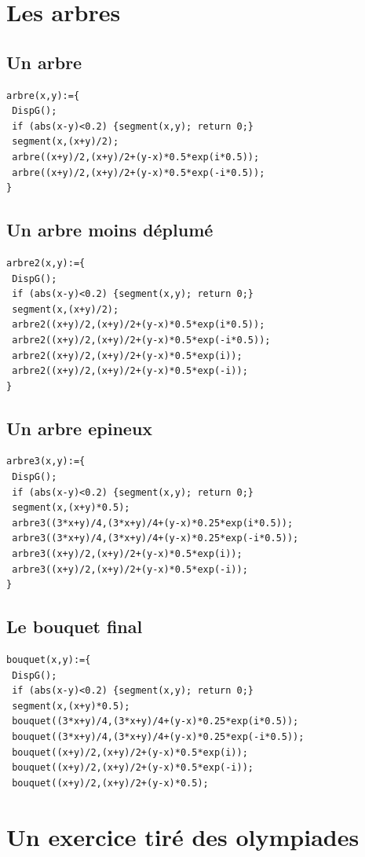 \documentclass[a4paper,11pt]{book}
\begin{document}
\section{Les arbres}
\subsection{Un arbre}
\begin{verbatim}
arbre(x,y):={
 DispG();
 if (abs(x-y)<0.2) {segment(x,y); return 0;}
 segment(x,(x+y)/2);
 arbre((x+y)/2,(x+y)/2+(y-x)*0.5*exp(i*0.5));
 arbre((x+y)/2,(x+y)/2+(y-x)*0.5*exp(-i*0.5));
}
\end{verbatim}
\subsection{Un arbre moins d\'eplum\'e}
\begin{verbatim}
arbre2(x,y):={
 DispG();
 if (abs(x-y)<0.2) {segment(x,y); return 0;}
 segment(x,(x+y)/2);
 arbre2((x+y)/2,(x+y)/2+(y-x)*0.5*exp(i*0.5));
 arbre2((x+y)/2,(x+y)/2+(y-x)*0.5*exp(-i*0.5));
 arbre2((x+y)/2,(x+y)/2+(y-x)*0.5*exp(i));
 arbre2((x+y)/2,(x+y)/2+(y-x)*0.5*exp(-i));
}
\end{verbatim}
\subsection{Un arbre epineux}
\begin{verbatim}
arbre3(x,y):={
 DispG();
 if (abs(x-y)<0.2) {segment(x,y); return 0;}
 segment(x,(x+y)*0.5);
 arbre3((3*x+y)/4,(3*x+y)/4+(y-x)*0.25*exp(i*0.5));
 arbre3((3*x+y)/4,(3*x+y)/4+(y-x)*0.25*exp(-i*0.5));
 arbre3((x+y)/2,(x+y)/2+(y-x)*0.5*exp(i));
 arbre3((x+y)/2,(x+y)/2+(y-x)*0.5*exp(-i));
}
\end{verbatim}
\subsection{Le bouquet final}
\begin{verbatim}
bouquet(x,y):={
 DispG();
 if (abs(x-y)<0.2) {segment(x,y); return 0;}
 segment(x,(x+y)*0.5);
 bouquet((3*x+y)/4,(3*x+y)/4+(y-x)*0.25*exp(i*0.5));
 bouquet((3*x+y)/4,(3*x+y)/4+(y-x)*0.25*exp(-i*0.5));
 bouquet((x+y)/2,(x+y)/2+(y-x)*0.5*exp(i));
 bouquet((x+y)/2,(x+y)/2+(y-x)*0.5*exp(-i));
 bouquet((x+y)/2,(x+y)/2+(y-x)*0.5);
\end{verbatim}
\section{Un exercice tir\'e des olympiades}
\end{document}
